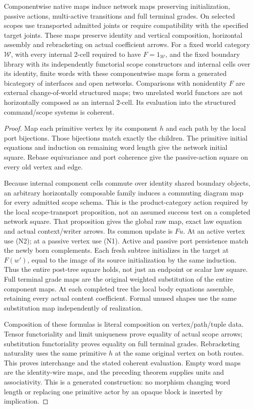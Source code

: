 \documentclass[11pt]{article}
\begin{document}
\begin{theorem}
Componentwise native maps induce network maps preserving initialization, passive actions, multi-active transitions and full terminal grades. On selected scopes use transported admitted joints or require compatibility with the specified target joints. These maps preserve identity and vertical composition, horizontal assembly and rebracketing on actual coefficient arrows. For a fixed world category $\mathcal W$, with every internal 2-cell required to have $F=1_{\mathcal W}$, and the fixed boundary library with its independently functorial scope constructors and internal cells over its identity, finite words with these componentwise maps form a generated bicategory of interfaces and open networks. Comparisons with nonidentity $F$ are external change-of-world structured maps; two unrelated world functors are not horizontally composed as an internal 2-cell. Its evaluation into the structured command/scope systems is coherent.
\end{theorem}
\begin{proof}
Map each primitive vertex by its component $h$ and each path by the local port bijections. Those bijections match exactly the children. The primitive initial equations and induction on remaining word length give the network initial square. Rebase equivariance and port coherence give the passive-action square on every old vertex and edge.

Because internal component cells commute over identity shared boundary objects, an arbitrary horizontally composable family induces a commuting diagram map for every admitted scope schema. This is the product-category action required by the local scope-transport proposition, not an assumed success test on a completed network square. That proposition gives the global raw map, exact law equation and actual context/writer arrows. Its common update is $Fu$. At an active vertex use (N2); at a passive vertex use (N1). Active and passive port persistence match the newly born complements. Each fresh subtree initializes in the target at $F(w')$, equal to the image of its source initialization by the same induction. Thus the entire post-tree square holds, not just an endpoint or scalar law square. Full terminal grade maps are the original weighted substitution of the entire component maps. At each completed tree the local body equations assemble, retaining every actual content coefficient. Formal unused shapes use the same substitution map independently of realization.

Composition of these formulas is literal composition on vertex/path/tuple data. Tensor functoriality and limit uniqueness prove equality of actual scope arrows; substitution functoriality proves equality on full terminal grades. Rebracketing naturality uses the same primitive $h$ at the same original vertex on both routes. This proves interchange and the stated coherent evaluation. Empty word maps are the identity-wire maps, and the preceding theorem supplies units and associativity. This is a generated construction: no morphism changing word length or replacing one primitive actor by an opaque block is inserted by implication.
\end{proof}
\end{document}
